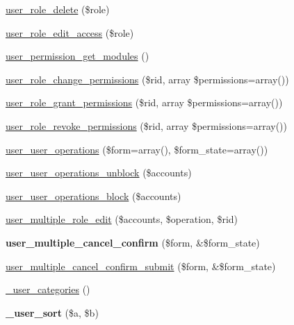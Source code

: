 \begin{DoxyCompactItemize}
\item 
\hyperlink{user_8module_a024c3e56a5d80847b3796565df75299f}{user\_\-role\_\-delete} (\$role)
\item 
\hyperlink{user_8module_a41a44a0043d57e6c56c651fd9060b4af}{user\_\-role\_\-edit\_\-access} (\$role)
\item 
\hyperlink{user_8module_a3f574091c39e067721fe6afbb5898bfd}{user\_\-permission\_\-get\_\-modules} ()
\item 
\hyperlink{user_8module_a99fd9206a99c083a3f7ee09ba0c4a9ea}{user\_\-role\_\-change\_\-permissions} (\$rid, array \$permissions=array())
\item 
\hyperlink{user_8module_aee75b0b96b7cec455cb0245275469aaf}{user\_\-role\_\-grant\_\-permissions} (\$rid, array \$permissions=array())
\item 
\hyperlink{user_8module_a5b4cb135247dfac81c93c8da05bcd514}{user\_\-role\_\-revoke\_\-permissions} (\$rid, array \$permissions=array())
\item 
\hyperlink{user_8module_a06d9d99e165bcd0da93901cee90158f5}{user\_\-user\_\-operations} (\$form=array(), \$form\_\-state=array())
\item 
\hyperlink{user_8module_aea3e4264e414a703905c12725a8fee3f}{user\_\-user\_\-operations\_\-unblock} (\$accounts)
\item 
\hyperlink{user_8module_a956597acb38e2078f714d140fe54443c}{user\_\-user\_\-operations\_\-block} (\$accounts)
\item 
\hyperlink{user_8module_ad0fd9700bee0f36a9f873deb2c80c534}{user\_\-multiple\_\-role\_\-edit} (\$accounts, \$operation, \$rid)
\item 
\hypertarget{user_8module_ac3423adc6ef44b75e0a20c0f733847f1}{
{\bfseries user\_\-multiple\_\-cancel\_\-confirm} (\$form, \&\$form\_\-state)}
\label{user_8module_ac3423adc6ef44b75e0a20c0f733847f1}

\item 
\hyperlink{user_8module_a7c21efb11cd202cddd82b3dc87fdd0a7}{user\_\-multiple\_\-cancel\_\-confirm\_\-submit} (\$form, \&\$form\_\-state)
\item 
\hyperlink{user_8module_a92dbc7c3bb262cecba5f28bbf93a5175}{\_\-user\_\-categories} ()
\item 
\hypertarget{user_8module_af1ac17818fc892a3caaf6e737df72e53}{
{\bfseries \_\-user\_\-sort} (\$a, \$b)}
\label{user_8module_af1ac17818fc892a3caaf6e737df72e53}


\end{DoxyCompactItemize}
